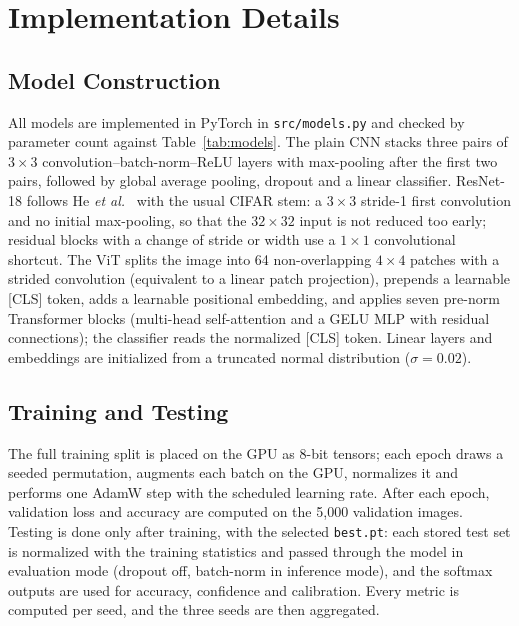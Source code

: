 \documentclass[conference]{IEEEtran}
\begin{document}
\section{Implementation Details}

\subsection{Model Construction}
All models are implemented in PyTorch in \texttt{src/models.py} and checked by parameter count against Table~\ref{tab:models}. The plain CNN stacks three pairs of $3\times3$ convolution--batch-norm--ReLU layers with max-pooling after the first two pairs, followed by global average pooling, dropout and a linear classifier. ResNet-18 follows He \emph{et al.}~\cite{he2016} with the usual CIFAR stem: a $3\times3$ stride-1 first convolution and no initial max-pooling, so that the $32\times32$ input is not reduced too early; residual blocks with a change of stride or width use a $1\times1$ convolutional shortcut. The ViT splits the image into 64 non-overlapping $4\times4$ patches with a strided convolution (equivalent to a linear patch projection), prepends a learnable [CLS] token, adds a learnable positional embedding, and applies seven pre-norm Transformer blocks (multi-head self-attention and a GELU MLP with residual connections); the classifier reads the normalized [CLS] token. Linear layers and embeddings are initialized from a truncated normal distribution ($\sigma = 0.02$).

\subsection{Training and Testing}
The full training split is placed on the GPU as 8-bit tensors; each epoch draws a seeded permutation, augments each batch on the GPU, normalizes it and performs one AdamW step with the scheduled learning rate. After each epoch, validation loss and accuracy are computed on the 5{,}000 validation images. Testing is done only after training, with the selected \texttt{best.pt}: each stored test set is normalized with the training statistics and passed through the model in evaluation mode (dropout off, batch-norm in inference mode), and the softmax outputs are used for accuracy, confidence and calibration. Every metric is computed per seed, and the three seeds are then aggregated.
\end{document}

